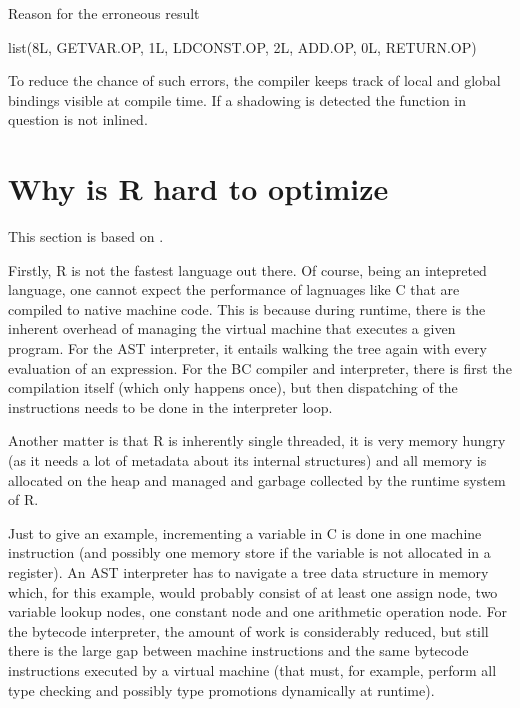 {\begin{listing}[htbp]
  \caption{\label{lst:disasm-broken}Reason for the erroneous result}
  \begin{rcode}
list(8L,
     GETVAR.OP, 1L,
     LDCONST.OP, 2L,
     ADD.OP, 0L,
     RETURN.OP)
  \end{rcode}
\end{listing}

To reduce the chance of such errors, the compiler keeps track of local and global bindings visible at compile time. If a shadowing is detected the function in question is not inlined.


\section{Why is R hard to optimize}

This section is based on  \autocite{design, hadley}.

Firstly, R is not the fastest language out there. Of course, being an intepreted language, one cannot expect the performance of lagnuages like C that are compiled to native machine code. This is because during runtime, there is the inherent overhead of managing the virtual machine that executes a given program. For the AST interpreter, it entails walking the tree again with every evaluation of an expression. For the BC compiler and interpreter, there is first the compilation itself (which only happens once), but then dispatching of the instructions needs to be done in the interpreter loop.

Another matter is that R is inherently single threaded, it is very memory hungry (as it needs a lot of metadata about its internal structures) and all memory is allocated on the heap and managed and garbage collected by the runtime system of R.

Just to give an example, incrementing a variable in C is done in one machine instruction (and possibly one memory store if the variable is not allocated in a register). An AST interpreter has to navigate a tree data structure in memory which, for this example, would probably consist of at least one assign node, two variable lookup nodes, one constant node and one arithmetic operation node. For the bytecode interpreter, the amount of work is considerably reduced, but still there is the large gap between machine instructions and the same bytecode instructions executed by a virtual machine (that must, for example, perform all type checking and possibly type promotions dynamically at runtime).

}
